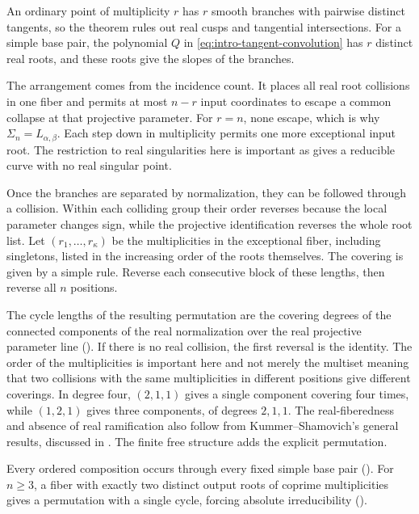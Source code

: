 \documentclass[12pt,reqno]{amsart}
\theoremstyle{definition}
\theoremstyle{remark}
\begin{document}
An ordinary point of multiplicity \(r\) has \(r\) smooth branches
with pairwise distinct tangents, so the theorem rules out real
cusps and tangential intersections. For a simple base pair,
the polynomial \(Q\) in \eqref{eq:intro-tangent-convolution}
has \(r\) distinct real roots, and these roots give the slopes
of the branches.

The arrangement comes from the incidence count.  It places all real
root collisions in one fiber and permits at most \(n-r\) input coordinates
to escape a common collapse at that projective parameter.  For \(r=n\),
none escape, which is why \(\Sigma_n=L_{\alpha,\beta}\). Each step down in multiplicity permits one more exceptional input root. The restriction to real singularities here is important as  gives a reducible curve with no real singular point.

Once the branches are separated by normalization, they can be followed
through a collision. Within each colliding group their order reverses
because the local parameter changes sign, while the projective
identification reverses the whole root list.  Let \((r_1,\ldots,r_{\kappa})\) be the multiplicities in the exceptional
fiber, including singletons, listed in the increasing order of the roots
themselves.  The covering is given by a simple rule. Reverse each consecutive block of these lengths, then reverse all
\(n\) positions.

The cycle lengths of the resulting permutation are the covering degrees
of the connected components of the real normalization over the real
projective parameter line ().  If there is no real collision, the first reversal is the identity.  The order of the multiplicities is important here and not merely the multiset meaning that two collisions with the same multiplicities in different positions give different coverings. In degree four, \((2,1,1)\) gives a single component covering four times, while \((1,2,1)\) gives three components, of degrees \(2,1,1\). The real-fiberedness and absence of real ramification also follow from Kummer--Shamovich's general results, discussed in . The finite free structure adds the explicit permutation.

Every ordered composition occurs through every fixed simple base pair
().  For \(n\geq3\), a fiber
with exactly two distinct output roots of coprime multiplicities gives
a permutation with a single cycle, forcing absolute irreducibility
().
\end{document}
